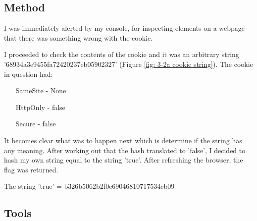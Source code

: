 \subsection{Method}

I was immediately alerted by my console, for inspecting elements on
a webpage that there was something wrong with the cookie.

I proceeded to check the contents of the cookie and it was
an arbitrary string '68934a3e9455fa72420237eb05902327' (Figure \vref{fig: 3-2a cookie string}). The
cookie in question had:
\begin{itemize}
    \item[SameSite] - None
    \item[HttpOnly] - false
    \item[Secure] - false
\end{itemize}
It becomes clear what was to happen next which is determine if the string
has any meaning. After working out that the hash translated to 'false', I
decided to hash my own string equal to the string 'true'.
After refreshing the browser, the flag was returned.

The string 'true' = b326b5062b2f0e69046810717534cb09

\subsection{Tools}


